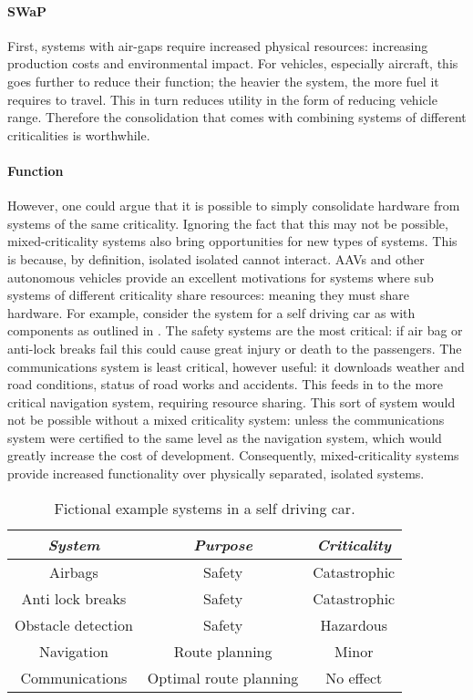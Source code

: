 \paragraph{SWaP} First, systems with air-gaps require increased physical
resources: increasing production costs and environmental impact.
For vehicles, especially aircraft, this goes further to reduce their function; the
heavier the system,  the more fuel it requires to travel. This in turn reduces
utility in the form of reducing vehicle range. Therefore the consolidation that comes
with combining systems of different criticalities is worthwhile.  

\paragraph{Function} 
However, one could argue that it is possible to simply consolidate hardware
from systems of the same criticality. Ignoring the fact that this may not be
possible, mixed-criticality systems also bring opportunities for new types of
systems. This is because, by definition, isolated isolated  cannot interact.
\glspl{AAV} and other autonomous vehicles provide an excellent motivations for
systems where sub systems of different criticality share resources: meaning
they must share hardware.  For example, consider the system for a self driving
car as with components as outlined in .  The safety
systems are the most critical: if air bag or anti-lock breaks fail this could
cause great injury or death to the passengers.  The communications system is
least critical, however useful: it downloads weather and road conditions,
status of road works and accidents.  This feeds in to the more critical
navigation system, requiring resource sharing.  This sort of system would not
be possible without a mixed criticality system: unless the communications
system were certified to the same level as the navigation system, which would
greatly increase the cost of development.  Consequently, mixed-criticality
systems provide increased functionality over physically separated, isolated
systems.

\begin{table} 
\centering
\begin{tabular}{ccc}\toprule
    \emph{System}     & \emph{Purpose} & \emph{Criticality} \\\midrule
     Airbags            & Safety &  Catastrophic \\
     Anti lock breaks   & Safety &  Catastrophic \\
     Obstacle detection & Safety &  Hazardous    \\
     Navigation         & Route planning & Minor \\  
     Communications     & Optimal route planning & No effect \\
    \bottomrule
\end{tabular}
\caption{Fictional example systems in a self driving car.}
\label{tab:self-driving-car}
\end{table}

